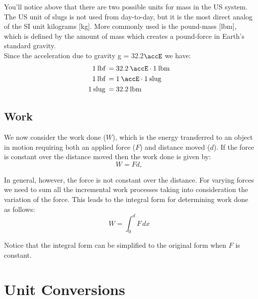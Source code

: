 You'll notice above that there are two possible units for mass in the US system.  The US unit of slugs is not used from day-to-day, but it is the most direct analog of the SI unit kilograms [kg].  More commonly used is the pound-mass [lbm], which is defined by the amount of mass which creates a pound-force in Earth's standard gravity.\\

Since the acceleration due to gravity g = 32.2$\accE$ we have:
\begin{align*}
  1\:\text{lbf}\:&=32.2\:\accE \cdot 1\:\text{lbm} \\
  1\:\text{lbf}\:&=1\:\accE \cdot 1\:\text{slug} \\
  1\:\text{slug}\:&=32.2\:\text{lbm}
\end{align*}



\subsection{Work}

We now consider the work done ($W$), which is the energy transferred to an object in motion requiring both an applied force ($F$) and distance moved ($d$). If the force is constant over the distance moved then the work done is given by:
\begin{equation*}
  W=F d,
\end{equation*}

In general, however, the force is not constant over the distance. For varying forces we need to sum all the incremental work processes taking into consideration the variation of the force. This leads to the integral form for determining work done as follows:
\begin{equation*}
  W=\int_0^d F\,dx
\end{equation*}

Notice that the integral form can be simplified to the original form when $F$ is constant.

\section{Unit Conversions}

